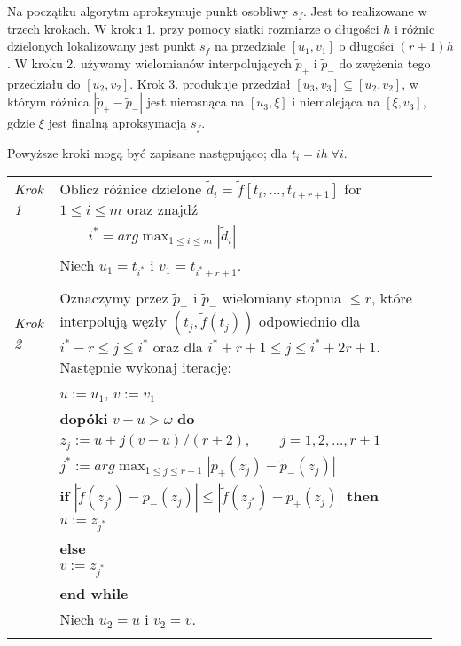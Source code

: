 \documentclass[oik, pdftex, robocza, man]{mgrwms}
\begin{document}
Na początku algorytm aproksymuje punkt osobliwy $s_f$. Jest to realizowane w trzech krokach. W kroku 1. przy pomocy siatki rozmiarze o długości $h$ i różnic dzielonych lokalizowany jest punkt $s_f$ na przedziale $[u_1, v_1]$ o długości $(r + 1)h$. W kroku 2. używamy wielomianów interpolujących $\tilde{p}_+$ i $\tilde{p}_-$ do zwężenia tego przedziału do $[u_2, v_2]$. Krok 3. produkuje przedział $[u_3, v_3] \subseteq [u_2, v_2]$, w którym różnica $|\tilde{p}_{+} - \tilde{p}_{-}|$ jest nierosnąca na $[u_3, \xi]$ i niemalejąca na $[\xi, v_3]$, gdzie $\xi$ jest finalną aproksymacją $s_f$.

Powyższe kroki mogą być zapisane następująco; dla $t_i = ih \; \forall i$. \vspace{10pt}

\noindent
\begin{tabular}{p{0.10\linewidth} p{0.85\linewidth}}
    
    \textit{Krok 1} & Oblicz różnice dzielone $\tilde{d}_i = \tilde{f}[t_i, \ldots, t_{i+r+1}]$ for $1 \leq i \leq m $ oraz znajdź \\
                    & \(\displaystyle \qquad i^* = arg \max_{1 \leq i \leq m }|\tilde{d}_i| \)  \\
                    & Niech $u_1 = t_{i^*}$ i $v_1 = t_{i^* + r + 1}$. \\
                    & \\

    \textit{Krok 2} & Oznaczymy przez $\tilde{p}_+$ i $\tilde{p}_-$ wielomiany stopnia $ \leq r$, które interpolują węzły $(t_j, \tilde{f}(t_j))$ odpowiednio dla $i^* - r \leq j \leq i^*$ oraz dla $i^* + r + 1 \leq j \leq i^* + 2r + 1$. Następnie wykonaj iterację: \\
                    & $u := u_1$, $v := v_1$ \\
                    & \textbf{dopóki} $v-u > \omega$ \textbf{do} \\
                    & \hspace{20pt}$z_j := u + j(v-u) / (r+2), \qquad j = 1, 2, \ldots, r + 1$ \\
                    & \hspace{20pt}\(\displaystyle j^* := arg \max_{1 \leq j \leq r + 1}|\tilde{p}_{+}(z_j) - \tilde{p}_{-}(z_j)| \) \\
                    & \hspace{20pt}\textbf{if} $|\tilde{f}(z_{j^*}) - \tilde{p}_{-}(z_j)| \leq |\tilde{f}(z_{j^*}) - \tilde{p}_{+}(z_j)|$ \textbf{then} \\
                    & \hspace{40pt}$u:= z_{j^*}$ \\
                    & \hspace{20pt}\textbf{else} \\
                    & \hspace{40pt}$v:= z_{j^*}$ \\
                    & \textbf{end while} \\
                    & Niech $u_2 = u$ i $v_2 = v$. \\
                    & \\


\end{tabular}
\end{document}
